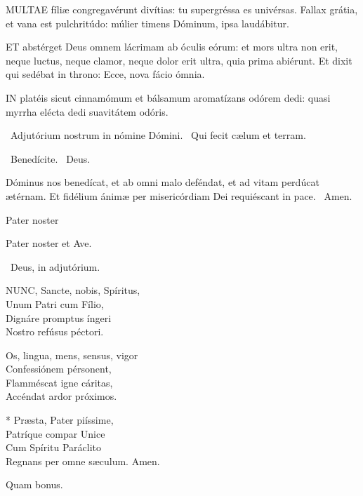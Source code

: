 
\lettrine[lines=2]{M}{ULTAE} fíliæ congregavérunt divítias: tu supergréssa es univérsas. Fallax grátia, et vana est pulchritúdo: múlier timens Dóminum, ipsa laudábitur.


\lettrine[lines=2]{E}{T} abstérget Deus omnem lácrimam ab óculis eórum: et mors ultra non erit, neque luctus, neque clamor, neque dolor erit ultra, quia prima abiérunt. Et dixit qui sedébat in throno: Ecce, nova fácio ómnia.


\lettrine[lines=2]{I}{N} platéis sicut cinnamómum et bálsamum aromatízans odórem dedi: quasi myrrha elécta dedi suavitátem odóris.

\V\ Adjutórium nostrum in nómine Dómini. \R\ Qui fecit cælum et terram.

\V\ Benedícite. \R\ Deus.

 Dóminus nos benedícat, et ab omni malo deféndat, et ad vitam perdúcat ætérnam. Et fidélium ánimæ per misericórdiam Dei requiéscant in pace. \R\ Amen.

 Pater noster 

\sectionornament


Pater noster et Ave.

\V\ Deus, in adjutórium.


\lettrine[lines=2]{N}{UNC}, Sancte, nobis, Spíritus,\\
Unum Patri cum Fílio,\\
Dignáre promptus íngeri\\
Nostro refúsus péctori.

Os, lingua, mens, sensus, vigor\\
Confessiónem pérsonent,\\
Flamméscat igne cáritas,\\
Accéndat ardor próximos.

* Præsta, Pater piíssime,\\
Patríque compar Unice\\
Cum Spíritu Paráclito\\
Regnans per omne sæculum. Amen.

  Quam bonus. \textdagger

